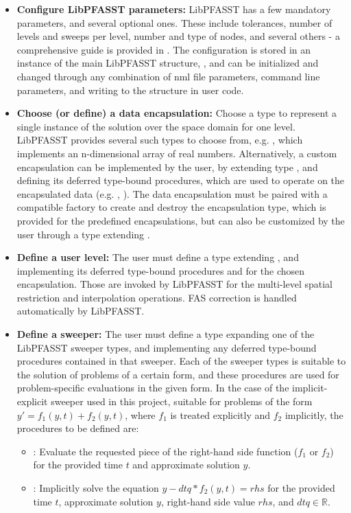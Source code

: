 \begin{itemize}
    \item \textbf{Configure LibPFASST parameters:} LibPFASST has a few mandatory parameters, and several optional ones. These include tolerances, number of levels and sweeps per level, number and type of nodes, and several others - a comprehensive guide is provided in \cite{libpfasst_ug}. The configuration is stored in an instance of the main LibPFASST structure, , and can be initialized and changed through any combination of nml file parameters, command line parameters, and writing to the  structure in user code.

    \item \textbf{Choose (or define) a data encapsulation:} Choose a type to represent a single instance of the solution over the space domain for one level. LibPFASST provides several such types to choose from, e.g. , which implements an n-dimensional array of real numbers. Alternatively, a custom encapsulation can be implemented by the user, by extending type , and defining its deferred type-bound procedures, which are used to operate on the encapsulated data (e.g. , ). The data encapsulation must be paired with a compatible factory to create and destroy the encapsulation type, which is provided for the predefined encapsulations, but can also be customized by the user through a type extending .

    \item \textbf{Define a user level:} The user must define a type extending , and implementing its deferred type-bound procedures  and  for the chosen encapsulation. Those are invoked by LibPFASST for the multi-level spatial restriction and interpolation operations. FAS correction is handled automatically by LibPFASST. 

    \item \textbf{Define a sweeper:} The user must define a type expanding one of the LibPFASST sweeper types, and implementing any deferred type-bound procedures contained in that sweeper. Each of the sweeper types is suitable to the solution of problems of a certain form, and these procedures are used for problem-specific evaluations in the given form. In the case of the implicit-explicit sweeper used in this project, suitable for problems of the form \(y'=f_1(y,t)+f_2(y,t)\), where \(f_1\) is treated explicitly and \(f_2\) implicitly, the procedures to be defined are:
    \begin{itemize}
        \item {}: Evaluate the requested piece of the right-hand side function (\(f_1\) or \(f_2\)) for the provided time \(t\) and approximate solution \(y\).
        \item {}: Implicitly solve the equation \(y-dtq*f_2(y,t)=rhs\) for the provided time \(t\), approximate solution \(y\), right-hand side value \(rhs\), and \(dtq\in\mathbb{R}\).
    \end{itemize}
\end{itemize}